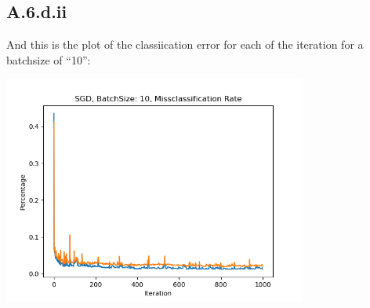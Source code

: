 \documentclass[]{article}
\begin{document}
    \subsection*{A.6.d.ii}
        And this is the plot of the classiication error for each of the iteration for a batchsize of ``10'': 
        \begin{center}
            \includegraphics[width=10cm]{A6-sgd-10-classification.png}
        \end{center}
    
\end{document}
